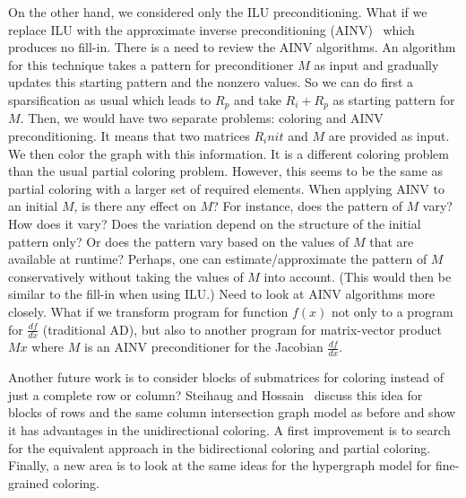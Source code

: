 \documentclass[12pt, oneside]{book}
\begin{document}
On the other hand, we considered only the ILU preconditioning.  What if we replace ILU with the approximate inverse preconditioning (AINV)~\cite{ainv98} which produces no fill-in. There is a need to review the AINV algorithms. An algorithm for this technique takes a pattern for preconditioner $M$ as input and gradually updates this starting pattern and the nonzero values.
So we can do first a sparsification as usual which leads to $R_p$ and take $R_i + R_p$ as starting pattern for $M$. Then, we would have two
separate problems: coloring and AINV preconditioning. It means that two matrices $R_init$ and $M$ are provided as input. We then color the graph with this information.  It is a different coloring problem than the usual partial coloring problem. However, this seems to be the same as partial coloring with a larger set of required elements.
When applying AINV to an initial $M$, is there any effect on $M$? For
instance, does the pattern of $M$ vary? How does it vary? Does the
variation depend on the structure of the initial pattern only? Or
does the pattern vary based on the values of $M$ that are available
at runtime? Perhaps, one can estimate/approximate the pattern of $M$
conservatively without taking the values of $M$ into account. (This
would then be similar to the fill-in when using ILU.) Need to look
at AINV algorithms more closely.
What if we transform program for function $f(x)$ not only to a program for $\frac{df}{dx}$ (traditional AD), but also to another program for matrix-vector product $Mx$ where $M$ is an AINV preconditioner for the Jacobian $\frac{df}{dx}$.

Another future work is to consider blocks of submatrices for coloring instead of just a complete row or column? Steihaug and Hossain~\cite{Steihaug1997GCa} discuss this idea for blocks of rows and the same column intersection graph model as before and show it has advantages in the unidirectional coloring. A first improvement is to search for the equivalent approach in the bidirectional coloring and partial coloring. Finally, a new area is to look at the same ideas for the hypergraph model for fine-grained coloring.


\end{document}
